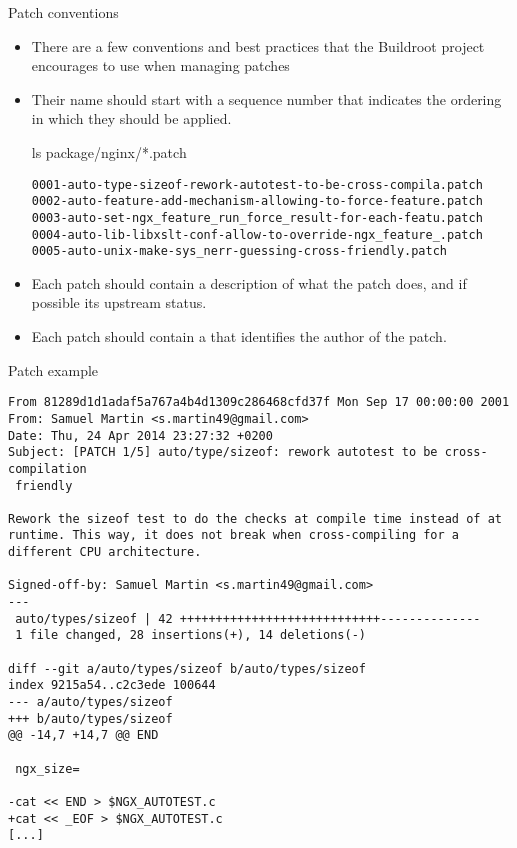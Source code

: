 \begin{frame}[fragile]{Patch conventions}
  \begin{itemize}
  \item There are a few conventions and best practices that the
    Buildroot project encourages to use when managing patches
  \item Their name should start with a sequence number that
    indicates the ordering in which they should be applied.
    \begin{block}{ls package/nginx/*.patch}
      {\scriptsize
\begin{verbatim}
0001-auto-type-sizeof-rework-autotest-to-be-cross-compila.patch
0002-auto-feature-add-mechanism-allowing-to-force-feature.patch
0003-auto-set-ngx_feature_run_force_result-for-each-featu.patch
0004-auto-lib-libxslt-conf-allow-to-override-ngx_feature_.patch
0005-auto-unix-make-sys_nerr-guessing-cross-friendly.patch
\end{verbatim}}
      \end{block}
    \item Each patch should contain a description of what the patch
      does, and if possible its upstream status.
    \item Each patch should contain a  that
      identifies the author of the patch.
    \end{itemize}
\end{frame}

\begin{frame}[fragile]{Patch example}

\begin{block}{}
{\tiny
\begin{verbatim}
From 81289d1d1adaf5a767a4b4d1309c286468cfd37f Mon Sep 17 00:00:00 2001
From: Samuel Martin <s.martin49@gmail.com>
Date: Thu, 24 Apr 2014 23:27:32 +0200
Subject: [PATCH 1/5] auto/type/sizeof: rework autotest to be cross-compilation
 friendly

Rework the sizeof test to do the checks at compile time instead of at
runtime. This way, it does not break when cross-compiling for a
different CPU architecture.

Signed-off-by: Samuel Martin <s.martin49@gmail.com>
---
 auto/types/sizeof | 42 ++++++++++++++++++++++++++++--------------
 1 file changed, 28 insertions(+), 14 deletions(-)

diff --git a/auto/types/sizeof b/auto/types/sizeof
index 9215a54..c2c3ede 100644
--- a/auto/types/sizeof
+++ b/auto/types/sizeof
@@ -14,7 +14,7 @@ END
 
 ngx_size=
 
-cat << END > $NGX_AUTOTEST.c
+cat << _EOF > $NGX_AUTOTEST.c
[...]
\end{verbatim}}
\end{block}

\end{frame}

